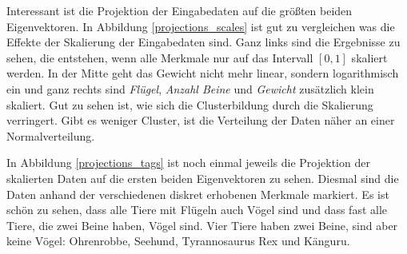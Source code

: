  Interessant ist die Projektion der Eingabedaten auf die größten beiden  Eigenvektoren. In Abbildung \ref{projections_scales} ist gut zu vergleichen was die Effekte der Skalierung der Eingabedaten sind. Ganz links sind die Ergebnisse zu sehen, die entstehen, wenn alle Merkmale nur auf das Intervall $[0, 1]$ skaliert werden. In der Mitte geht das Gewicht nicht mehr linear, sondern logarithmisch ein und ganz rechts sind \emph{Flügel}, \emph{Anzahl Beine} und \emph{Gewicht} zusätzlich klein skaliert. Gut zu sehen ist, wie sich die Clusterbildung durch die Skalierung verringert. Gibt es weniger Cluster, ist die Verteilung der Daten näher an einer Normalverteilung.
 
 In Abbildung \ref{projections_tags} ist noch einmal jeweils die Projektion der skalierten Daten auf die ersten beiden Eigenvektoren zu sehen. Diesmal sind die Daten anhand der verschiedenen diskret erhobenen Merkmale markiert. Es ist \zb schön zu sehen, dass alle Tiere mit Flügeln auch Vögel sind und dass fast alle Tiere, die zwei Beine haben, Vögel sind. Vier Tiere haben zwei Beine, sind aber keine Vögel: Ohrenrobbe, Seehund, Tyrannosaurus Rex und Känguru.

